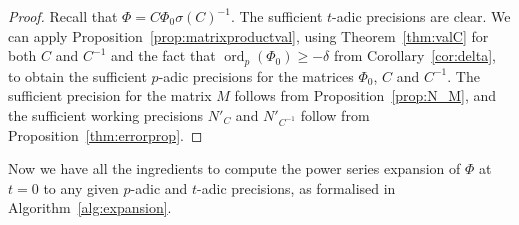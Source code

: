 \documentclass[a4paper,11pt]{article}
\numberwithin{equation}{section}
\DeclareMathOperator{\ord}{ord}          %
\theoremstyle{definition}
\begin{document}
\begin{proof}
Recall that $\Phi = C \Phi_0 \sigma(C)^{-1}$. The sufficient $t$-adic 
precisions are clear. We can apply Proposition~\ref{prop:matrixproductval}, 
using Theorem~\ref{thm:valC} for both $C$ and $C^{-1}$ and the fact that 
$\ord_p(\Phi_0) \geq -\delta$ from Corollary~\ref{cor:delta}, to obtain 
the sufficient $p$-adic precisions for the matrices $\Phi_0$, $C$ and $C^{-1}$. 
The sufficient precision for the matrix $M$ follows from Proposition~\ref{prop:N_M},
and the sufficient working precisions $N'_C$ and $N'_{C^{-1}}$
follow from Proposition~\ref{thm:errorprop}.
\end{proof}

Now we have all the ingredients to compute the power series expansion of 
$\Phi$ at $t=0$ to any given $p$-adic and $t$-adic precisions, as formalised 
in Algorithm~\ref{alg:expansion}.
\end{document}
